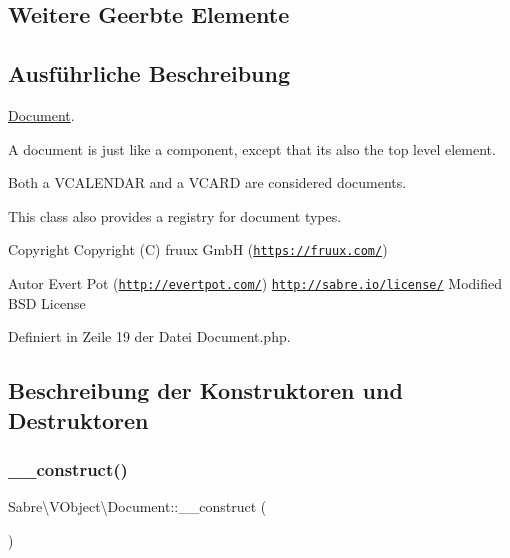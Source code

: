\subsection*{Weitere Geerbte Elemente}


\subsection{Ausführliche Beschreibung}
\mbox{\hyperlink{class_sabre_1_1_v_object_1_1_document}{Document}}.

A document is just like a component, except that it\textquotesingle{}s also the top level element.

Both a V\+C\+A\+L\+E\+N\+D\+AR and a V\+C\+A\+RD are considered documents.

This class also provides a registry for document types.

\begin{DoxyCopyright}{Copyright}
Copyright (C) fruux GmbH (\href{https://fruux.com/}{\tt https\+://fruux.\+com/}) 
\end{DoxyCopyright}
\begin{DoxyAuthor}{Autor}
Evert Pot (\href{http://evertpot.com/}{\tt http\+://evertpot.\+com/})  \href{http://sabre.io/license/}{\tt http\+://sabre.\+io/license/} Modified B\+SD License 
\end{DoxyAuthor}


Definiert in Zeile 19 der Datei Document.\+php.



\subsection{Beschreibung der Konstruktoren und Destruktoren}
\mbox{\label{class_sabre_1_1_v_object_1_1_document_a3d735f6345e32ba5fac61f29fea4ed40}} 
\subsubsection{\texorpdfstring{\+\_\+\+\_\+construct()}{\_\_construct()}}
{\footnotesize\ttfamily Sabre\textbackslash{}\+V\+Object\textbackslash{}\+Document\+::\+\_\+\+\_\+construct (\begin{DoxyParamCaption}{ }\end{DoxyParamCaption})}

